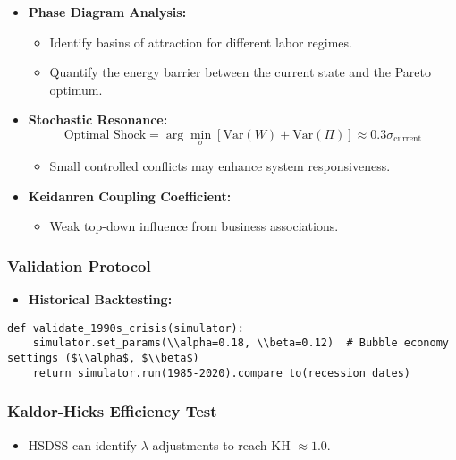 \documentclass[10pt]{article}
\theoremstyle{definition}
\begin{document}
\begin{itemize}
    \item \textbf{Phase Diagram Analysis:}
        \begin{itemize}
            \item Identify basins of attraction for different labor regimes.
            \item Quantify the energy barrier between the current state and the Pareto optimum.
        \end{itemize}
    \item \textbf{Stochastic Resonance:}
        \begin{equation}
        \text{Optimal Shock} = \arg\min_\sigma [\text{Var}(W) + \text{Var}(\Pi)] \approx 0.3\sigma_{\text{current}}
        \end{equation}
        \begin{itemize}
            \item Small controlled conflicts may enhance system responsiveness.
        \end{itemize}
    \item \textbf{Keidanren Coupling Coefficient:}
        \begin{itemize}
            \item Weak top-down influence from business associations.
        \end{itemize}
\end{itemize}

\subsubsection{Validation Protocol}

\begin{itemize}
    \item \textbf{Historical Backtesting:}
    \end{itemize}


\begin{lstlisting}[caption={Python Validation Code for 1990s Crisis}]
def validate_1990s_crisis(simulator):
    simulator.set_params(\\alpha=0.18, \\beta=0.12)  # Bubble economy settings ($\\alpha$, $\\beta$)
    return simulator.run(1985-2020).compare_to(recession_dates)
\end{lstlisting}

\subsubsection{Kaldor-Hicks Efficiency Test}
\begin{itemize}
    \item HSDSS can identify $\lambda$ adjustments to reach KH $\approx 1.0$.
\end{itemize}
\end{document}
